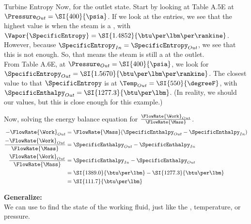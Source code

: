 \begin{example}{Turbine Entropy}
  Now, for the outlet state.
  Start by looking at Table A.5E at $\Pressure_{Out} = \SI{400}{\psia}$.
  If we look at the  entries, we see that the highest value is when the steam is a , with $\Vapor{\SpecificEntropy} = \SI{1.4852}{\btu\per\lbm\per\rankine}$.
  However, because $\SpecificEntropy_{In} = \SpecificEntropy_{Out}$, we see that this is not enough.
  So, that means the steam is still a  at the outlet. \\
  From Table A.6E, at $\Pressure_{Out} = \SI{400}{\psia}$, we look for $\SpecificEntropy_{Out} = \SI{1.5670}{\btu\per\lbm\per\rankine}$.
  The closest value to that $\SpecificEntropy$ is at $\Temp_{Out} = \SI{550}{\degreeF}$, with $\SpecificEnthalpy_{Out} = \SI{1277.3}{\btu\per\lbm}$.
  (In reality, we should  our values, but this is close enough for this example.)

  Now, solving the energy balance equation for $\frac{\FlowRate{\Work}_{Out}}{\FlowRate{\Mass}}$.
  \begin{align*}
    - \FlowRate{\Work}_{Out} &= \FlowRate{\Mass} (\SpecificEnthalpy_{Out} - \SpecificEnthalpy_{In}) \\
    \frac{-\FlowRate{\Work}_{Out}}{\FlowRate{\Mass}} &= \SpecificEnthalpy_{Out} - \SpecificEnthalpy_{In} \\
    \frac{\FlowRate{\Work}_{Out}}{\FlowRate{\Mass}} &= \SpecificEnthalpy_{In} - \SpecificEnthalpy_{Out} \\
                           &= \SI{1389.0}{\btu\per\lbm} - \SI{1277.3}{\btu\per\lbm} \\
    &= \SI{111.7}{\btu\per\lbm}
  \end{align*}

  \textbf{Generalize:} \\
  We can use  to find the state of the working fluid, just like the , temperature, or pressure.
\end{example}

